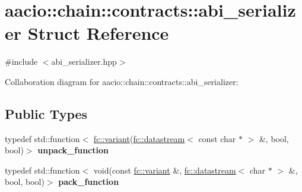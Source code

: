 \hypertarget{structaacio_1_1chain_1_1contracts_1_1abi__serializer}{}\section{aacio\+:\+:chain\+:\+:contracts\+:\+:abi\+\_\+serializer Struct Reference}
\label{structaacio_1_1chain_1_1contracts_1_1abi__serializer}


{\ttfamily \#include $<$abi\+\_\+serializer.\+hpp$>$}



Collaboration diagram for aacio\+:\+:chain\+:\+:contracts\+:\+:abi\+\_\+serializer\+:
\subsection*{Public Types}
\begin{DoxyCompactItemize}
\item 
\mbox{\label{structaacio_1_1chain_1_1contracts_1_1abi__serializer_aa4990708ed3471d925d31d4fcf00b9b1}} 
typedef std\+::function$<$ \mbox{\hyperlink{classfc_1_1variant}{fc\+::variant}}(\mbox{\hyperlink{classfc_1_1datastream}{fc\+::datastream}}$<$ const char $\ast$ $>$ \&, bool, bool)$>$ {\bfseries unpack\+\_\+function}
\item 
\mbox{\label{structaacio_1_1chain_1_1contracts_1_1abi__serializer_aadf77d0439acfd9d62ef214e7813d92c}} 
typedef std\+::function$<$ void(const \mbox{\hyperlink{classfc_1_1variant}{fc\+::variant}} \&, \mbox{\hyperlink{classfc_1_1datastream}{fc\+::datastream}}$<$ char $\ast$ $>$ \&, bool, bool)$>$ {\bfseries pack\+\_\+function}
\end{DoxyCompactItemize}
